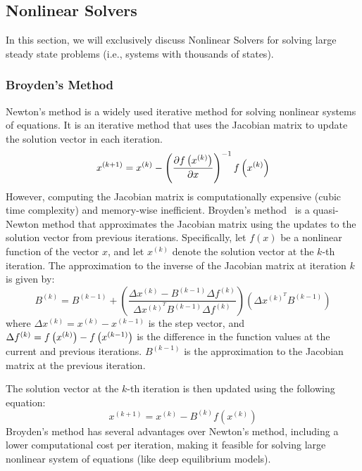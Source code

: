 \subsection{Nonlinear Solvers}
\label{subsec:nonlinear_solvers_deqs}

In this section, we will exclusively discuss Nonlinear Solvers for solving large steady state problems (i.e., systems with thousands of states).

\subsubsection{Broyden's Method}
\label{subsubsec:broyden_method}

Newton's method is a widely used iterative method for solving nonlinear systems of equations. It is an iterative method that uses the Jacobian matrix to update the solution vector in each iteration.
%
\begin{equation}
  x^{(k+1)} = x^{(k)} - \left( \frac{\partial f\left(x^{(k)}\right)}{\partial x} \right)^{-1} f\left(x^{(k)}\right) \label{eq:newton_method}
\end{equation}
%
However, computing the Jacobian matrix is computationally expensive (cubic time complexity) and memory-wise inefficient. Broyden's method~\citep{broyden1965class} is a quasi-Newton method that approximates the Jacobian matrix using the updates to the solution vector from previous iterations. Specifically, let $f(x)$ be a nonlinear function of the vector $x$, and let $x^{(k)}$ denote the solution vector at the $k$-th iteration. The approximation to the inverse of the Jacobian matrix at iteration $k$ is given by:
%
\begin{equation}
  B^{(k)} = B^{(k-1)} + \left(\frac{\Delta x^{(k)} - B^{(k - 1)} \Delta f^{(k)}}{\Delta x^{(k)^T} B^{(k - 1)} \Delta f^{(k)}}\right) \left(\Delta x^{(k)^T} B^{(k - 1)}\right)
\end{equation}
%
where $\Delta x^{(k)} = x^{(k)} - x^{(k-1)}$ is the step vector, and $\Delta f^{(k)} = f\left(x^{(k)}\right) - f\left(x^{(k-1)}\right)$ is the difference in the function values at the current and previous iterations. $B^{(k-1)}$ is the approximation to the Jacobian matrix at the previous iteration.

The solution vector at the $k$-th iteration is then updated using the following equation:
%
\begin{equation}
  x^{(k+1)} = x^{(k)} - B^{(k)}f(x^{(k)})
\end{equation}
%
Broyden's method has several advantages over Newton's method, including a lower computational cost per iteration, making it feasible for solving large nonlinear system of equations (like deep equilibrium models).

